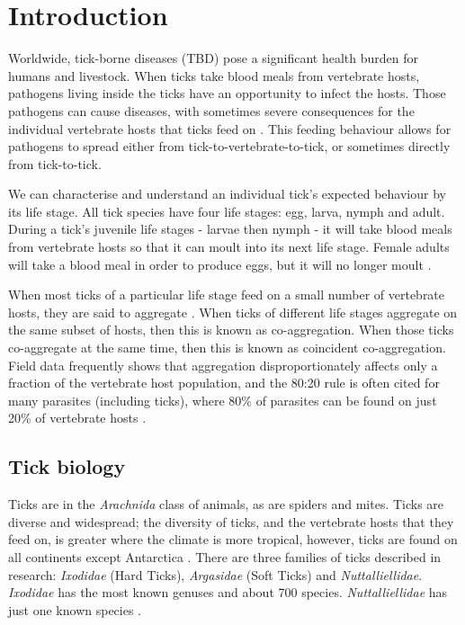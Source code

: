 \documentclass[hidelinks]{article}
\begin{document}
\thispagestyle{empty}
\addtocounter{page}{-1}

\newpage

\tableofcontents

\thispagestyle{empty}
\addtocounter{page}{-1}

\newpage

\section{Introduction}

Worldwide, tick-borne diseases (TBD) pose a significant health burden for humans and livestock. When ticks take blood meals from vertebrate hosts, pathogens living inside the ticks have an opportunity to infect the hosts. Those pathogens can cause diseases, with sometimes severe consequences for the individual vertebrate hosts that ticks feed on \citep{Johnson2023e}. This feeding behaviour allows for pathogens to spread either from tick-to-vertebrate-to-tick, or sometimes directly from tick-to-tick.

We can characterise and understand an individual tick's expected behaviour by its life stage. All tick species have four life stages: egg, larva, nymph and adult. During a tick's juvenile life stages - larvae then nymph - it will take blood meals from vertebrate hosts so that it can moult into its next life stage. Female adults will take a blood meal in order to produce eggs, but it will no longer moult \citep{Johnson2023a}.

When most ticks of a particular life stage feed on a small number of vertebrate hosts, they are said to aggregate \citep{JohnstoneRobertson2020}. When ticks of different life stages aggregate on the same subset of hosts, then this is known as co-aggregation. When those ticks co-aggregate at the same time, then this is known as coincident co-aggregation. Field data frequently shows that aggregation disproportionately affects only a fraction of the vertebrate host population, and the 80:20 rule is often cited for many parasites (including ticks), where 80\% of parasites can be found on just 20\% of vertebrate hosts \citep{Woolhouse1997}.

\subsection{Tick biology}

Ticks are in the \textit{Arachnida} class of animals, as are spiders and mites. Ticks are diverse and widespread; the diversity of ticks, and the vertebrate hosts that they feed on, is greater where the climate is more tropical, however, ticks are found on all continents except Antarctica \citep{Johnson2023a}. There are three families of ticks described in research: \textit{Ixodidae} (Hard Ticks), \textit{Argasidae} (Soft Ticks) and \textit{Nuttalliellidae}. \textit{Ixodidae} has the most known genuses and about 700 species. \textit{Nuttalliellidae} has just one known species \citep{Nicholson2019}.
\end{document}
